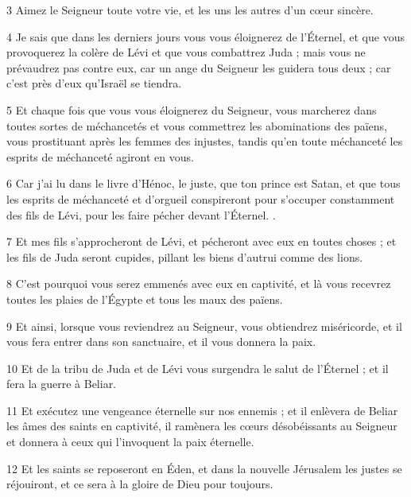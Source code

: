 \par 3 Aimez le Seigneur toute votre vie, et les uns les autres d'un cœur sincère.

\par 4 Je sais que dans les derniers jours vous vous éloignerez de l'Éternel, et que vous provoquerez la colère de Lévi et que vous combattrez Juda ; mais vous ne prévaudrez pas contre eux, car un ange du Seigneur les guidera tous deux ; car c'est près d'eux qu'Israël se tiendra.

\par 5 Et chaque fois que vous vous éloignerez du Seigneur, vous marcherez dans toutes sortes de méchancetés et vous commettrez les abominations des païens, vous prostituant après les femmes des injustes, tandis qu'en toute méchanceté les esprits de méchanceté agiront en vous.

\par 6 Car j'ai lu dans le livre d'Hénoc, le juste, que ton prince est Satan, et que tous les esprits de méchanceté et d'orgueil conspireront pour s'occuper constamment des fils de Lévi, pour les faire pécher devant l'Éternel. .

\par 7 Et mes fils s'approcheront de Lévi, et pécheront avec eux en toutes choses ; et les fils de Juda seront cupides, pillant les biens d'autrui comme des lions.

\par 8 C'est pourquoi vous serez emmenés avec eux en captivité, et là vous recevrez toutes les plaies de l'Égypte et tous les maux des païens.

\par 9 Et ainsi, lorsque vous reviendrez au Seigneur, vous obtiendrez miséricorde, et il vous fera entrer dans son sanctuaire, et il vous donnera la paix.

\par 10 Et de la tribu de Juda et de Lévi vous surgendra le salut de l'Éternel ; et il fera la guerre à Beliar.

\par 11 Et exécutez une vengeance éternelle sur nos ennemis ; et il enlèvera de Beliar les âmes des saints en captivité, il ramènera les cœurs désobéissants au Seigneur et donnera à ceux qui l'invoquent la paix éternelle.

\par 12 Et les saints se reposeront en Éden, et dans la nouvelle Jérusalem les justes se réjouiront, et ce sera à la gloire de Dieu pour toujours.

